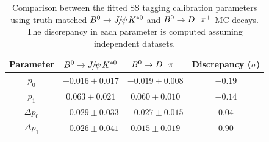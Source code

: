 \begin{table}[tbp]
        \centering
        \caption{Comparison between the fitted SS tagging calibration parameters using truth-matched \mbox{$\Bz\to\jpsi\Kstarz$} and $B^0\rightarrow D^-\pi^+$
        MC decays. The discrepancy in each parameter is computed assuming independent datasets.}
        \begin{tabular}{cccc}
          \toprule
          Parameter   &  $\Bz\to\jpsi\Kstarz$   &  $B^0\rightarrow D^-\pi^+$  &   Discrepancy ($\sigma$) \\
          \midrule
          $p_0$   &   $-0.016\pm0.017$   &   $-0.019\pm0.008$   &   $-0.19$ \\
          $p_1$   &   $0.063\pm0.021$   &   $0.060\pm0.010$   &   $-0.14$ \\
          $\Delta p_0$   &   $-0.029\pm0.033$   &   $-0.027\pm0.015$   &   $0.04$ \\
          $\Delta p_1$   &   $-0.026\pm0.041$   &   $0.015\pm0.019$   &   $0.90$ \\
          \bottomrule
        \end{tabular}
        \label{tab:ss_calib_portability_mc}
\end{table}


